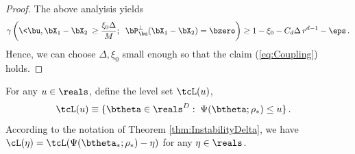 \documentclass[11pt]{article}
\begin{document}
\begin{proof}

The above analyisis yields
%
\begin{align}
%
\gamma\left(\<\bu,\bX_1-\bX_2\>\ge \frac{\xi_0\Delta}{M};\;\; \bP^{\perp}_{\bu} (\bX_1-\bX_2)=\bzero\right)\ge 1-\xi_0-C_d\Delta\, r^{d-1}-\eps\, .
%
\end{align}
%
Hence, we can choose $\Delta, \xi_0$ small enough so that the claim (\ref{eq:Coupling}) holds.
\end{proof}


For any $u \in \reals$, define the level set $\tcL(u)$, 
\begin{align}\label{eqn:LevelSet_tilde}
\tcL(u) &\equiv \{\btheta\in\reals^D:\; \Psi(\btheta;\rho_*)\le u\}\, .
\end{align}
According to the notation of Theorem \ref{thm:InstabilityDelta}, we have $\cL(\eta) = \tcL( \Psi(\btheta_*; \rho_*) - \eta)$ for any $\eta \in \reals$. 
\end{document}
